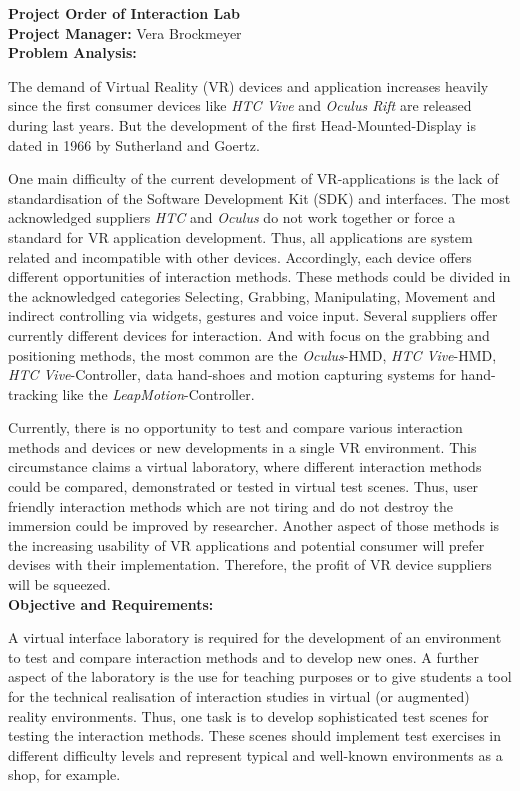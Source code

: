 \documentclass[a4paper, 12pt]{article}
\newcommand{\changefont}[3]{
\fontfamily{#1} \fontseries{#2} \fontshape{#3} \selectfont}
\begin{document}


\newpage


\textbf{\Large Project Order of Interaction Lab}\\


\textbf{Project Manager:} Vera Brockmeyer\\


\textbf{Problem Analysis:}

The demand of Virtual Reality (VR) devices and application increases heavily since the first consumer devices like \textit{HTC Vive} and \textit{Oculus Rift} are released during last years. But the development of the first Head-Mounted-Display is dated in 1966 by Sutherland and Goertz. 

One main difficulty of the current development of VR-applications is the lack of standardisation of the Software Development Kit (SDK) and interfaces. The most acknowledged suppliers \textit{HTC} and \textit{Oculus} do not work together or force a standard for VR application development. Thus, all applications are system related and incompatible with other devices. Accordingly, each device offers different opportunities of interaction methods. These methods could be divided in the acknowledged categories Selecting, Grabbing, Manipulating, Movement and indirect controlling via widgets, gestures and voice input. Several suppliers offer currently different devices for interaction. And with focus on the grabbing and positioning methods, the most common are the \textit{Oculus}-HMD, \textit{HTC Vive}-HMD, \textit{HTC Vive}-Controller, data hand-shoes and motion capturing systems for hand-tracking like the \textit{LeapMotion}-Controller.

Currently, there is no opportunity to test and compare various interaction methods and devices or new developments in a single VR environment. This circumstance claims a virtual laboratory, where different interaction methods could be compared, demonstrated or tested in virtual test scenes. Thus, user friendly interaction methods which are not tiring and do not destroy the immersion could be improved by researcher. Another aspect of those methods is the increasing usability of VR applications and potential consumer will prefer devises with their implementation. Therefore, the profit of VR device suppliers will be squeezed. \\

\textbf{Objective and Requirements:}

A virtual interface laboratory is required for the development of an environment to test and compare interaction methods and to develop new ones. A further aspect of the laboratory is the use for teaching purposes or to give students a tool for the technical realisation of interaction studies in virtual (or augmented) reality environments. Thus, one task is to develop sophisticated test scenes for testing the interaction methods. These scenes should implement test exercises in different difficulty levels and represent typical and well-known environments as a shop, for example. \\
\end{document}
